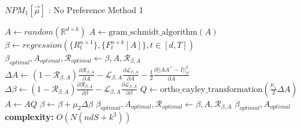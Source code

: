 
\begin{algorithm}[H]
\caption{$NPM_1[\vec{\mu}]$ : No Preference Method 1}\label{no_preference_method_1}
\begin{algorithmic}[1]
\State $A \gets random(\mathbb{R}^{d\times k})$
\State $A \gets \text{gram\_schmidt\_algorithm}(A)$
\State $\beta \gets regression(\{R^{n\times 1}_{t}\},\{F^{n\times k}_{t}[A]\}, t\in [d,T])$
\State $\beta_{optimal}, A_{optimal}, \mathcal{R}_{optimal} \gets \beta, A, \mathcal{R}_{\beta, A}$
    \State $\Delta A \gets (1-\mathcal{R}_{\beta, A})\frac{\partial \mathcal{R}_{\beta, A}}{\partial A} - \mathcal{L}_{\beta, A} \frac{\partial \mathcal{L}_{\beta, A}}{\partial A}- \frac{1}{2}\frac{\partial ||AA^\top -I||^2_F}{\partial A} $
    \State $\Delta \beta \gets (1-\mathcal{R}_{\beta, A})\frac{\partial \mathcal{R}_{\beta, A}}{\partial \beta} - \mathcal{L}_{\beta, A} \frac{\partial \mathcal{L}_{\beta, A}}{\partial \beta} $
    \State $Q \gets \text{ortho\_cayley\_transformation}(\frac{\mu_1}{2} \Delta A)$
    \State $A \gets AQ$
    \State $\beta \gets \beta + \mu_2 \Delta \beta$
      
        \State $\beta_{optimal}, A_{optimal}, \mathcal{R}_{optimal} \gets \beta, A, \mathcal{R}_{\beta, A} $
    \EndIf 
\EndFor
\State \Return  $\beta_{optimal}, A_{optimal}$
\State \textbf{complexity: } $O(N(ndS+k^3))$
\end{algorithmic}
\end{algorithm}

